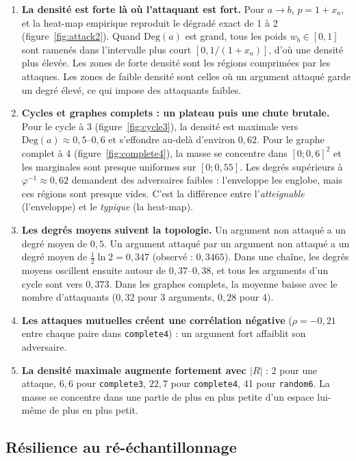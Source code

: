\documentclass[10pt,a4paper]{article}
\theoremstyle{remark}
\newcommand{\Deg}{\mathrm{Deg}}
\begin{document}
\begin{enumerate}
\item \textbf{La densité est forte là où l'attaquant est fort.} Pour $a\to b$, $p=1+x_a$, et la
heat-map empirique reproduit le dégradé exact de 1 à 2 (figure~\ref{fig:attack2}). Quand
$\Deg(a)$ est grand, tous les poids $w_b\in[0,1]$ sont ramenés dans l'intervalle plus court
$[0,1/(1+x_a)]$, d'où une densité plus élevée. Les zones de forte densité sont les régions
comprimées par les attaques. Les zones de faible densité sont celles où un argument attaqué
garde un degré élevé, ce qui impose des attaquants faibles.
\item \textbf{Cycles et graphes complets : un plateau puis une chute brutale.} Pour le cycle à 3
(figure~\ref{fig:cycle3}), la densité est maximale vers $\Deg(a)\approx 0{,}5$--$0{,}6$ et
s'effondre au-delà d'environ $0{,}62$. Pour le graphe complet à 4 (figure~\ref{fig:complete4}),
la masse se concentre dans $[0;0{,}6]^2$ et les marginales sont presque uniformes sur
$[0;0{,}55]$. Les degrés supérieurs à $\varphi^{-1}\approx0{,}62$ demandent des adversaires
faibles : l'enveloppe les englobe, mais ces régions sont presque vides. C'est la différence
entre l'\emph{atteignable} (l'enveloppe) et le \emph{typique} (la heat-map).
\item \textbf{Les degrés moyens suivent la topologie.} Un argument non attaqué a un degré moyen
de $0{,}5$. Un argument attaqué par un argument non attaqué a un degré moyen de
$\tfrac12\ln 2=0{,}347$ (observé : $0{,}3465$). Dans une chaîne, les degrés moyens oscillent
ensuite autour de $0{,}37$--$0{,}38$, et tous les arguments d'un cycle sont vers $0{,}373$.
Dans les graphes complets, la moyenne baisse avec le nombre d'attaquants ($0{,}32$ pour 3
arguments, $0{,}28$ pour 4).
\item \textbf{Les attaques mutuelles créent une corrélation négative} ($\rho=-0{,}21$ entre
chaque paire dans \texttt{complete4}) : un argument fort affaiblit son adversaire.
\item \textbf{La densité maximale augmente fortement avec $|R|$} : 2 pour une attaque, $6{,}6$
pour \texttt{complete3}, $22{,}7$ pour \texttt{complete4}, 41 pour \texttt{random6}. La masse se
concentre dans une partie de plus en plus petite d'un espace lui-même de plus en plus petit.
\end{enumerate}

\subsection{Résilience au ré-échantillonnage}
\end{document}
